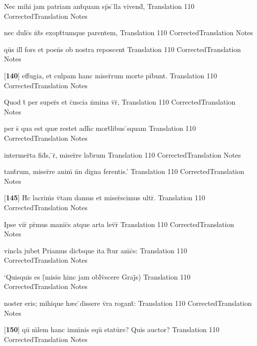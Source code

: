 \latline
  {Nec mihi jam patriam ant\={\macron {\i}}quam sp\={}s \={}lla vivend\={\macron {\i}},}
  { Translation }
  {110}
  { CorrectedTranslation }
  { Notes }


\latline
  {nec dulc\={\macron {\i}}s n\={}t\={}s exopt\={}tumque parentem,}
  { Translation }
  {110}
  { CorrectedTranslation }
  { Notes }


\latline
  {qu\={}s ill\={\macron {\i}} fors et poen\={}s ob nostra reposcent}
  { Translation }
  {110}
  { CorrectedTranslation }
  { Notes }


\latline
  {[\textbf{140}] effugia, et culpam hanc miser\={}rum morte pi\={}bunt.}
  { Translation }
  {110}
  { CorrectedTranslation }
  { Notes }


\latline
  {Quod t\={} per super\={}s et c\={}nscia n\={}mina v\={}r\={\macron {\i}},}
  { Translation }
  {110}
  { CorrectedTranslation }
  { Notes }


\latline
  {per s\={\macron {\i}} qua est qu{\ae} restet adh\={}c mort\={}libus \={}squam}
  { Translation }
  {110}
  { CorrectedTranslation }
  { Notes }


\latline
  {intermer\={}ta fid\={}s, \={}r\={}, miser\={}re lab\={}rum}
  { Translation }
  {110}
  { CorrectedTranslation }
  { Notes }


\latline
  {tant\={}rum, miser\={}re anim\={\macron {\i}} n\={}n digna ferentis.'}
  { Translation }
  {110}
  { CorrectedTranslation }
  { Notes }


\latline
  {[\textbf{145}] H\={\macron {\i}}c lacrim\={\macron {\i}}s v\={\macron {\i}}tam damus et miser\={}scimus ultr\={}.}
  { Translation }
  {110}
  { CorrectedTranslation }
  { Notes }


\latline
  {Ipse vir\={} pr\={\macron {\i}}mus manic\={}s atque arta lev\={}r\={\macron {\i}}}
  { Translation }
  {110}
  { CorrectedTranslation }
  { Notes }


\latline
  {vincla jubet Priamus dict\={\macron {\i}}sque ita f\={}tur am\={\macron {\i}}c\={\macron {\i}}s:}
  { Translation }
  {110}
  { CorrectedTranslation }
  { Notes }


\latline
  {`Quisquis es (\={}miss\={}s hinc jam obl\={\macron {\i}}v\={\macron {\i}}scere Graj\={}s)}
  { Translation }
  {110}
  { CorrectedTranslation }
  { Notes }


\latline
  {noster eris; mihique h{\ae}c \={}dissere v\={}ra rogant\={\macron {\i}}:}
  { Translation }
  {110}
  { CorrectedTranslation }
  { Notes }


\latline
  {[\textbf{150}] qu\={} m\={}lem hanc imm\={}nis equ\={\macron {\i}} statu\={}re?  Quis auctor?}
  { Translation }
  {110}
  { CorrectedTranslation }
  { Notes }


